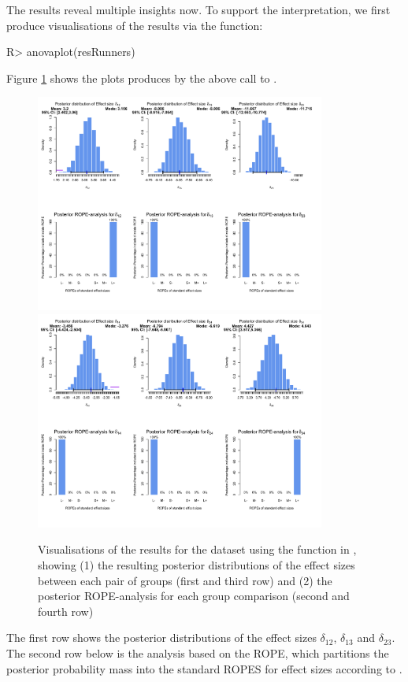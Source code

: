 The results reveal multiple insights now. To support the interpretation, we first produce visualisations of the results via the  function:
\begin{example}
R> anovaplot(resRunners)
\end{example}
Figure \ref{fig:plotHR1} shows the plots produces by the above call to . 
\begin{figure}[h!]
\centering
\includegraphics[width=0.85\textwidth]{plotHR1}
\includegraphics[width=0.85\textwidth]{plotHR2}
\caption{Visualisations of the results for the  dataset using the  function in , showing (1) the resulting posterior distributions of the effect sizes between each pair of groups (first and third row) and (2) the posterior ROPE-analysis for each group comparison (second and fourth row)}
\label{fig:plotHR1}
\end{figure}
The first row shows the posterior distributions of the effect sizes $\delta_{12}$, $\delta_{13}$ and $\delta_{23}$. The second row below is the analysis based on the ROPE, which partitions the posterior probability mass into the standard ROPES for effect sizes according to \cite{cohen_statistical_1988}. 

